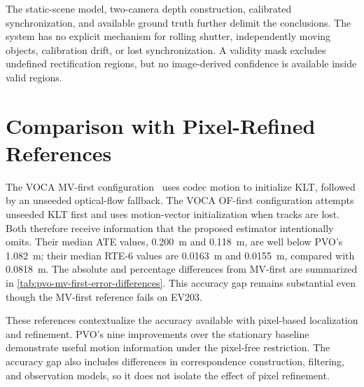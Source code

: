 The static-scene model, two-camera depth construction, calibrated
synchronization, and available ground truth further delimit the conclusions.
The system has no explicit mechanism for rolling shutter, independently moving
objects, calibration drift, or lost synchronization. A validity mask excludes
undefined rectification regions, but no image-derived confidence is available
inside valid regions.

\section{Comparison with Pixel-Refined References}

The VOCA MV-first configuration~\cite{hilscher2026voca} uses codec motion to
initialize KLT, followed by an unseeded optical-flow fallback. The VOCA OF-first
configuration attempts unseeded KLT first and uses motion-vector initialization
when tracks are lost. Both therefore receive information that the proposed
estimator intentionally omits.
Their median ATE values, \SI{0.200}{\metre} and \SI{0.118}{\metre}, are well
below PVO's \SI{1.082}{\metre}; their median RTE-6 values are
\SI{0.0163}{\metre} and \SI{0.0155}{\metre}, compared with
\SI{0.0818}{\metre}. The absolute and percentage differences from MV-first are
summarized in \autoref{tab:pvo-mv-first-error-differences}. This accuracy gap
remains substantial even though the MV-first reference fails on EV203.

These references contextualize the accuracy available with pixel-based
localization and refinement. PVO's nine improvements over the stationary baseline
demonstrate useful motion information under the pixel-free restriction. The
accuracy gap also includes differences in correspondence construction, filtering,
and observation models, so it does not isolate the effect of pixel refinement.
